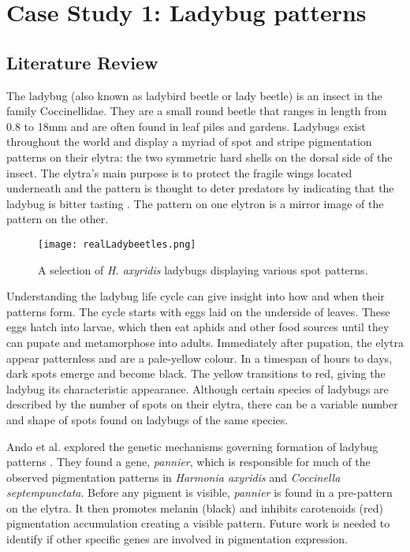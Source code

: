 \chapter{Case Study 1: Ladybug patterns}

\section{Literature Review}
The ladybug (also known as ladybird beetle or lady beetle) is an insect in the family Coccinellidae. They are a small round beetle that ranges in length from 0.8 to 18mm \citep{King1996} and are often found in leaf piles and gardens. Ladybugs exist throughout the world and display a myriad of spot and stripe pigmentation patterns on their elytra: the two symmetric hard shells on the dorsal side of the insect. The elytra's main purpose is to protect the fragile wings located underneath and the pattern is thought to deter predators by indicating that the ladybug is bitter tasting \citep{King1996}. The pattern on one elytron is a mirror image of the pattern on the other. 

\begin{figure}[ht]
	\centering
	\texttt{[image: realLadybeetles.png]}
	\caption{A selection of \textit{H. axyridis} ladybugs displaying various spot patterns. \citep{Entomart2019}}
	\label{fig:realLadyBugPatterns}
\end{figure}

Understanding the ladybug life cycle can give insight into how and when their patterns form. The cycle starts with eggs laid on the underside of leaves. These eggs hatch into larvae, which then eat aphids and other food sources until they can pupate and metamorphose into adults. Immediately after pupation, the elytra appear patternless and are a pale-yellow colour. In a timespan of hours to days, dark spots emerge and become black. The yellow transitions to red, giving the ladybug its characteristic appearance. Although certain species of ladybugs are described by the number of spots on their elytra, there can be a variable number and shape of spots found on ladybugs of the same species.

Ando et al. explored the genetic mechanisms governing formation of ladybug patterns \citep{Ando2018}. They found a gene, \textit{pannier}, which is responsible for much of the observed pigmentation patterns in \textit{Harmonia axyridis} and \textit{Coccinella septempunctata}. Before any pigment is visible, \textit{pannier} is found in a pre-pattern on the elytra. It then promotes melanin (black) and inhibits carotenoids (red) pigmentation accumulation creating a visible pattern. Future work is needed to identify if other specific genes are involved in pigmentation expression.

